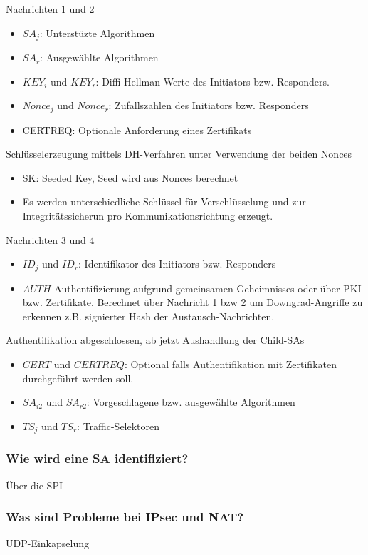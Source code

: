 	Nachrichten 1 und 2
	\begin{itemize}
		\item $SA_j$: Unterstüzte Algorithmen
		\item $SA_r$: Ausgewählte Algorithmen
		\item $KEY_i$ und $KEY_r$: Diffi-Hellman-Werte des Initiators bzw. Responders.
		\item $Nonce_j$ und $Nonce_r$: Zufallszahlen des Initiators bzw. Responders
		\item CERTREQ: Optionale Anforderung eines Zertifikats
		
	\end{itemize}
	Schlüsselerzeugung mittels DH-Verfahren unter Verwendung der beiden Nonces
	\begin{itemize}
		\item SK: Seeded Key, Seed wird aus Nonces berechnet
		\item Es werden unterschiedliche Schlüssel für Verschlüsselung und zur Integritätssicherun pro Kommunikationsrichtung erzeugt.
	\end{itemize}
	Nachrichten 3 und 4
	\begin{itemize}
		\item $ID_j$ und $ID_r$: Identifikator des Initiators bzw. Responders
		\item $AUTH$ Authentifizierung aufgrund gemeinsamen Geheimnisses oder über PKI bzw. Zertifikate. Berechnet über Nachricht 1 bzw 2 um Downgrad-Angriffe zu erkennen z.B. signierter Hash der Austausch-Nachrichten.
	\end{itemize}
	Authentifikation abgeschlossen, ab jetzt Aushandlung der Child-SAs
	\begin{itemize}
		\item $CERT$ und $CERTREQ$: Optional falls Authentifikation mit Zertifikaten durchgeführt werden soll.
		\item $SA_{i2}$ und $SA_{r2}$: Vorgeschlagene bzw. ausgewählte Algorithmen
		\item $TS_j$ und $TS_r$: Traffic-Selektoren
	\end{itemize}
	
	\subsubsection{Wie wird eine SA identifiziert?}
	Über die SPI
	
	\subsubsection{Was sind Probleme bei IPsec und NAT?}
	UDP-Einkapselung
		
